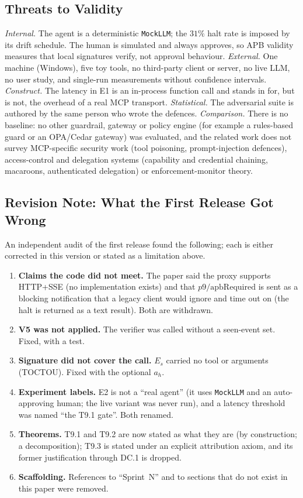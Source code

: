 \documentclass[11pt]{article}
\newcommand{\Es}{E_s}
\newcommand{\ahash}{a_h}   %
\begin{document}
\subsection{Threats to Validity}

\emph{Internal.} The agent is a deterministic \texttt{MockLLM}; the
$31\%$ halt rate is imposed by its drift schedule. The human is
simulated and always approves, so APB validity measures that local
signatures verify, not approval behaviour. \emph{External.} One
machine (Windows), five toy tools, no third-party client or server, no
live LLM, no user study, and single-run measurements without confidence
intervals. \emph{Construct.} The latency in E1 is an in-process
function call and stands in for, but is not, the overhead of a real MCP
transport. \emph{Statistical.} The adversarial suite is authored by the
same person who wrote the defences. \emph{Comparison.} There is no
baseline: no other guardrail, gateway or policy engine (for example a
rules-based guard or an OPA/Cedar gateway) was evaluated, and the
related work does not survey MCP-specific security work (tool
poisoning, prompt-injection defences), access-control and delegation
systems (capability and credential chaining, macaroons, authenticated
delegation) or enforcement-monitor theory.

\subsection{Revision Note: What the First Release Got Wrong}

An independent audit of the first release found the following; each is
either corrected in this version or stated as a limitation above.
\begin{enumerate}[leftmargin=2em, topsep=2pt, itemsep=2pt]
  \item \textbf{Claims the code did not meet.} The paper said the proxy
        supports HTTP+SSE (no implementation exists) and that
        $p9/\mathrm{apbRequired}$ is sent as a blocking notification that
        a legacy client would ignore and time out on (the halt is
        returned as a text result). Both are withdrawn.
  \item \textbf{V5 was not applied.} The verifier was called without a
        seen-event set. Fixed, with a test.
  \item \textbf{Signature did not cover the call.} $\Es$ carried no tool
        or arguments (TOCTOU). Fixed with the optional $\ahash$.
  \item \textbf{Experiment labels.} E2 is not a ``real agent'' (it uses
        \texttt{MockLLM} and an auto-approving human; the live variant
        was never run), and a latency threshold was named ``the T9.1
        gate''. Both renamed.
  \item \textbf{Theorems.} T9.1 and T9.2 are now stated as what they are
        (by construction; a decomposition); T9.3 is stated under an
        explicit attribution axiom, and its former justification through
        DC.1 is dropped.
  \item \textbf{Scaffolding.} References to ``Sprint~N'' and to sections
        that do not exist in this paper were removed.
\end{enumerate}
\end{document}
